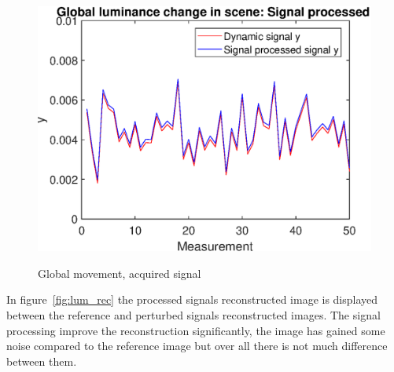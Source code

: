 \begin{figure}[H]
\begin{minipage}[t]{0.50\textwidth}
    \includegraphics[width = \textwidth]{result/dynamic/lum/intense_change_sp_ref_win.eps}
    \label{fig:lum_sig_4}
\end{minipage}
    \caption{Global movement, acquired signal}
    \label{fig:lum_sig}
\end{figure}

In figure~\ref{fig:lum_rec} the processed signals reconstructed image is displayed between the reference and perturbed signals reconstructed images. The signal processing improve the reconstruction significantly, the image has gained some noise compared to the reference image but over all there is not much difference between them.


